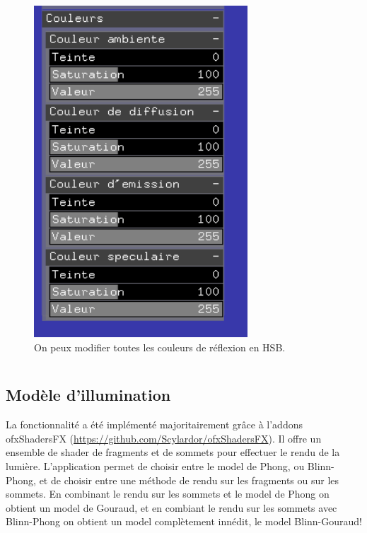 \begin{figure}[h]
	\centering
	\includegraphics[width=8cm]{fig/materiaux.png}
	\caption{On peux modifier toutes les couleurs de réflexion en HSB.}
	\label{fig:materiaux}
\end{figure}

\begin{lstlisting}
\end{lstlisting}


\subsection{Modèle d'illumination}
La fonctionnalité a été implémenté majoritairement grâce à l'addons ofxShadersFX (\url{https://github.com/Scylardor/ofxShadersFX}). Il offre un ensemble de shader de fragments et de sommets pour effectuer le rendu de la lumière. L'application permet de choisir entre le model de Phong, ou Blinn-Phong, et de choisir entre une méthode de rendu sur les fragments ou sur les sommets. En combinant le rendu sur les sommets et le model de Phong on obtient un model de Gouraud, et en combiant le rendu sur les sommets avec Blinn-Phong on obtient un model complètement innédit, le model Blinn-Gouraud!

